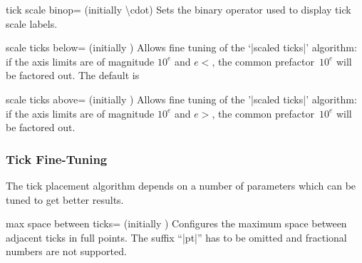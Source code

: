 \begin{pgfplotskey}{tick scale binop= (initially \textbackslash cdot)}
	Sets the binary operator used to display tick scale labels.
\begin{codeexample}[]
\end{codeexample}

\begin{codeexample}[]
\end{codeexample}
\end{pgfplotskey}

\makeatletter
\let\itsinitial=\pgfplots@scale@ticks@below@exponent
\makeatother
\begin{pgfplotskey}{scale ticks below= (initially \itsinitial)}
Allows fine tuning of the `|scaled ticks|' algorithm: if the axis limits are of magnitude $10^e$ and $e<$, the common prefactor~$10^e$ will be factored out. The default is 
\end{pgfplotskey}

\makeatletter
\let\itsinitial=\pgfplots@scale@ticks@above@exponent
\makeatother
\begin{pgfplotskey}{scale ticks above= (initially \itsinitial)}
Allows fine tuning of the '|scaled ticks|' algorithm: if the axis limits are of magnitude $10^e$ and $e>$, the common prefactor~$10^e$ will be factored out.
\end{pgfplotskey}


\subsubsection{Tick Fine-Tuning}
The tick placement algorithm depends on a number of parameters which can be tuned to get better results.
\begin{pgfplotskey}{max space between ticks= (initially \axisdefaulttickwidth)}
\label{maxspacebetweenticks}
	Configures the maximum space between adjacent ticks in full points. The suffix ``|pt|'' has to be omitted and fractional numbers are not supported.
\end{pgfplotskey}

